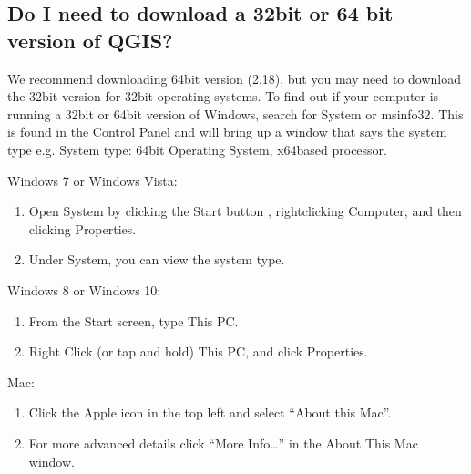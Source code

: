 \documentclass[letterpaper,10pt,english]{sphinxmanual}
\begin{document}
\subsection{Do I need to download a 32\sphinxhyphen{}bit or 64 bit version of QGIS?}
\label{\detokenize{Introduction/faq:do-i-need-to-download-a-32-bit-or-64-bit-version-of-qgis}}
\sphinxAtStartPar
We recommend downloading 64\sphinxhyphen{}bit version (2.18), but you may need to download
the 32\sphinxhyphen{}bit version for 32\sphinxhyphen{}bit operating systems. To find out if your computer
is running a 32\sphinxhyphen{}bit or 64\sphinxhyphen{}bit version of Windows,  search for System or
msinfo32. This is found in the Control Panel and will bring up a window that
says the system type e.g. System type: 64\sphinxhyphen{}bit Operating System, x64\sphinxhyphen{}based
processor.

\sphinxAtStartPar
Windows 7 or Windows Vista:
\begin{enumerate}
%
\item {} 
\sphinxAtStartPar
Open System by clicking the Start button , right\sphinxhyphen{}clicking Computer, and then
clicking Properties.

\item {} 
\sphinxAtStartPar
Under System, you can view the system type.

\end{enumerate}

\sphinxAtStartPar
Windows 8 or Windows 10:
\begin{enumerate}
%
\item {} 
\sphinxAtStartPar
From the Start screen, type This PC.

\item {} 
\sphinxAtStartPar
Right Click (or tap and hold) This PC, and click Properties.

\end{enumerate}

\sphinxAtStartPar
Mac:
\begin{enumerate}
%
\item {} 
\sphinxAtStartPar
Click the Apple icon in the top left and select “About this Mac”.

\item {} 
\sphinxAtStartPar
For more advanced details click “More Info…” in the About This Mac window.

\end{enumerate}
\end{document}
